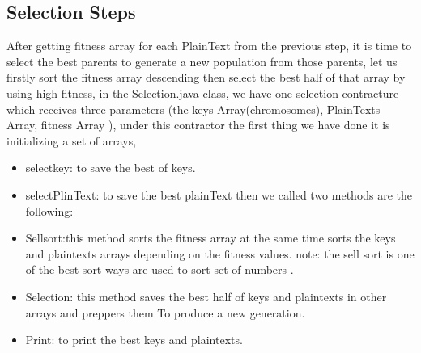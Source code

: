 \subsection{Selection Steps}
After getting fitness array for each PlainText from the previous step, it is time to select the best parents to generate a new population from those parents, let us firstly sort the fitness array descending then select the best half of that array by using high fitness, in the Selection.java class, we have one selection contracture which receives three parameters (the keys Array(chromosomes), PlainTexts Array, fitness Array ), under this contractor the first thing we have done it is initializing a set of arrays,
\begin{itemize}
    \item{\textsf{selectkey:} to save the best of keys.}
    \item{\textsf{selectPlinText:} to save the best plainText then we called two methods are the following:}
\end{itemize}
\begin{itemize}
    \item{\textsf{Sellsort:}this method sorts the fitness array at the same time sorts the keys and plaintexts arrays depending on the fitness values. note: the sell sort is one of the best sort ways are used to sort set of numbers \cite{goodrich2011randomized}.}
    \item{\textsf{Selection:} this method saves the best half of keys and plaintexts in other arrays and preppers them To produce a new generation.}
    \item{\textsf{Print:} to print the best keys and plaintexts.}
\end{itemize}
